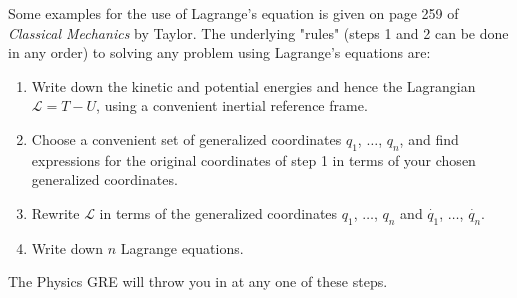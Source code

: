 Some examples for the use of Lagrange's equation is given on page 259 of {\itshape Classical Mechanics} by Taylor. The underlying "rules" (steps 1 and 2 can be done in any order) to solving any problem using Lagrange's equations are:

\begin{enumerate}
    \item Write down the kinetic and potential energies and hence the Lagrangian $\mathcal{L} = T-U$, using a convenient inertial reference frame.
    \item Choose a convenient set of generalized coordinates $q_1$, $\dots$, $q_n$, and find expressions for the original coordinates of step 1 in terms of your chosen generalized coordinates.
    \item Rewrite $\mathcal{L}$ in terms of the generalized coordinates $q_1$, $\dots$, $q_n$ and $\dot{q_1}$, $\dots$, $\dot{q_n}$.
    \item Write down $n$ Lagrange equations.
\end{enumerate}

The Physics GRE will throw you in at any one of these steps.
